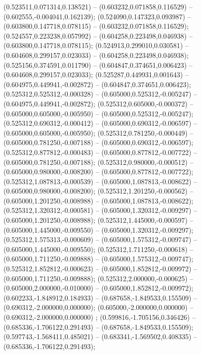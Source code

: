  (0.523511,0.071314,0.138521) -- (0.603232,0.071858,0.116529) -- (0.602555,-0.004041,0.162139);
 (0.524090,0.147323,0.093987) -- (0.603800,0.147718,0.078115) -- (0.603232,0.071858,0.116529);
 (0.524557,0.223238,0.057992) -- (0.604258,0.223498,0.046938) -- (0.603800,0.147718,0.078115);
 (0.524913,0.299010,0.030581) -- (0.604608,0.299157,0.023033) -- (0.604258,0.223498,0.046938);
 (0.525156,0.374591,0.011790) -- (0.604847,0.374651,0.006423) -- (0.604608,0.299157,0.023033);
 (0.525287,0.449931,0.001643) -- (0.604975,0.449941,-0.002872) -- (0.604847,0.374651,0.006423);
 (0.525312,0.525312,-0.000328) -- (0.605000,0.525312,-0.005247) -- (0.604975,0.449941,-0.002872);
 (0.525312,0.605000,-0.000372) -- (0.605000,0.605000,-0.005950) -- (0.605000,0.525312,-0.005247);
 (0.525312,0.690312,-0.000412) -- (0.605000,0.690312,-0.006597) -- (0.605000,0.605000,-0.005950);
 (0.525312,0.781250,-0.000449) -- (0.605000,0.781250,-0.007188) -- (0.605000,0.690312,-0.006597);
 (0.525312,0.877812,-0.000483) -- (0.605000,0.877812,-0.007722) -- (0.605000,0.781250,-0.007188);
 (0.525312,0.980000,-0.000512) -- (0.605000,0.980000,-0.008200) -- (0.605000,0.877812,-0.007722);
 (0.525312,1.087813,-0.000539) -- (0.605000,1.087813,-0.008622) -- (0.605000,0.980000,-0.008200);
 (0.525312,1.201250,-0.000562) -- (0.605000,1.201250,-0.008988) -- (0.605000,1.087813,-0.008622);
 (0.525312,1.320312,-0.000581) -- (0.605000,1.320312,-0.009297) -- (0.605000,1.201250,-0.008988);
 (0.525312,1.445000,-0.000597) -- (0.605000,1.445000,-0.009550) -- (0.605000,1.320312,-0.009297);
 (0.525312,1.575313,-0.000609) -- (0.605000,1.575312,-0.009747) -- (0.605000,1.445000,-0.009550);
 (0.525312,1.711250,-0.000618) -- (0.605000,1.711250,-0.009888) -- (0.605000,1.575312,-0.009747);
 (0.525312,1.852812,-0.000623) -- (0.605000,1.852812,-0.009972) -- (0.605000,1.711250,-0.009888);
 (0.525312,2.000000,-0.000625) -- (0.605000,2.000000,-0.010000) -- (0.605000,1.852812,-0.009972);
 (0.602233,-1.848912,0.184933) -- (0.687658,-1.849533,0.155509) -- (0.690312,-2.000000,0.000000);
 (0.605000,-2.000000,0.000000) -- (0.690312,-2.000000,0.000000) ;
 (0.599816,-1.705156,0.346426) -- (0.685336,-1.706122,0.291493) -- (0.687658,-1.849533,0.155509);
 (0.597743,-1.568411,0.485021) -- (0.683341,-1.569502,0.408335) -- (0.685336,-1.706122,0.291493);

